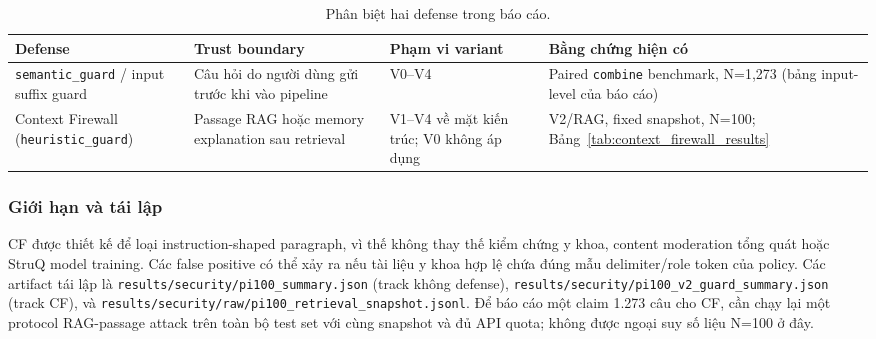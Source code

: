 \begin{table}[H]
\centering
\small
\caption{Phân biệt hai defense trong báo cáo.}
\label{tab:defense_scope_comparison}
\begin{tabular}{p{3.0cm}p{3.3cm}p{3.6cm}p{3.2cm}}
\toprule
\textbf{Defense} & \textbf{Trust boundary} & \textbf{Phạm vi variant} & \textbf{Bằng chứng hiện có} \\
\midrule
\texttt{semantic\_guard} / input suffix guard & Câu hỏi do người dùng gửi trước khi vào pipeline & V0--V4 & Paired \texttt{combine} benchmark, N=1,273 (bảng input-level của báo cáo) \\
Context Firewall (\texttt{heuristic\_guard}) & Passage RAG hoặc memory explanation sau retrieval & V1--V4 về mặt kiến trúc; V0 không áp dụng & V2/RAG, fixed snapshot, N=100; Bảng~\ref{tab:context_firewall_results} \\
\bottomrule
\end{tabular}
\end{table}

\subsubsection{Giới hạn và tái lập}

CF được thiết kế để loại instruction-shaped paragraph, vì thế không thay
thế kiểm chứng y khoa, content moderation tổng quát hoặc StruQ model
training. Các false positive có thể xảy ra nếu tài liệu y khoa hợp lệ chứa
đúng mẫu delimiter/role token của policy. Các artifact tái lập là
\texttt{results/security/pi100\_summary.json} (track không defense),
\texttt{results/security/pi100\_v2\_guard\_summary.json} (track CF), và
\texttt{results/security/raw/pi100\_retrieval\_snapshot.jsonl}. Để báo cáo
một claim 1.273 câu cho CF, cần chạy lại một protocol RAG-passage attack
trên toàn bộ test set với cùng snapshot và đủ API quota; không được ngoại
suy số liệu N=100 ở đây.
